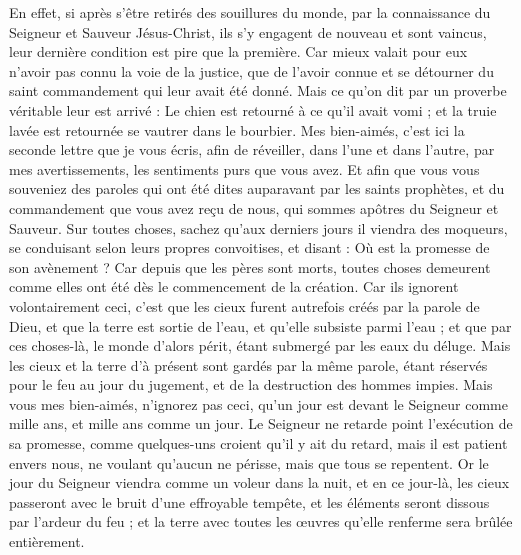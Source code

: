 \begin{multicols}{2}
En effet, si après s’être retirés des souillures du monde, par la connaissance du Seigneur et Sauveur Jésus-Christ, ils s’y engagent de nouveau et sont vaincus, leur dernière condition est pire que la première{}.
Car mieux valait pour eux n'avoir pas connu la voie de la justice, que de l'avoir connue et se détourner du saint commandement qui leur avait été donné.
Mais ce qu'on dit par un proverbe véritable leur est arrivé : Le chien est retourné à ce qu'il avait vomi ; et la truie lavée est retournée se vautrer dans le bourbier.
\VerseOne{}Mes bien-aimés, c'est ici la seconde lettre que je vous écris, afin de réveiller, dans l'une et dans l'autre, par mes avertissements, les sentiments purs que vous avez.
Et afin que vous vous souveniez des paroles qui ont été dites auparavant par les saints prophètes, et du commandement que vous avez reçu de nous, qui sommes apôtres du Seigneur et Sauveur.
Sur toutes choses, sachez qu'aux derniers jours{} il viendra des moqueurs, se conduisant selon leurs propres convoitises,
et disant : Où est la promesse de son avènement ? Car depuis que les pères sont morts, toutes choses demeurent comme elles ont été dès le commencement de la création.
Car ils ignorent volontairement ceci, c’est que les cieux furent autrefois créés par la parole de Dieu, et que la terre est sortie de l'eau, et qu'elle subsiste parmi l'eau ;
et que par ces choses-là, le monde d'alors périt, étant submergé par les eaux du déluge{}.
Mais les cieux et la terre d’à présent sont gardés par la même parole, étant réservés pour le feu au jour du jugement, et de la destruction des hommes impies.
Mais vous mes bien-aimés, n'ignorez pas ceci, qu'un jour est devant le Seigneur comme mille ans, et mille ans comme un jour{}.
Le Seigneur ne retarde point l'exécution de sa promesse, comme quelques-uns croient qu'il y ait du retard, mais il est patient envers nous, ne voulant qu'aucun ne périsse, mais que tous se repentent.
Or le jour{} du Seigneur viendra comme un voleur dans la nuit, et en ce jour-là, les cieux passeront avec le bruit d’une effroyable tempête, et les éléments seront dissous par l'ardeur du feu ; et la terre avec toutes les œuvres qu’elle renferme sera brûlée entièrement.

\end{multicols}
